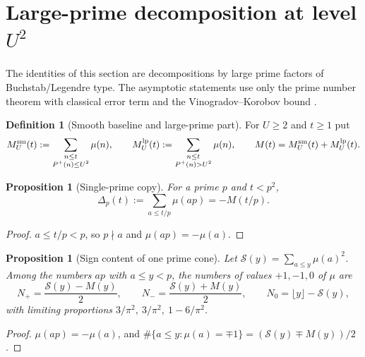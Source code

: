 \documentclass[11pt]{amsart}
\numberwithin{equation}{section}
\theoremstyle{plain}
\newtheorem{proposition}[theorem]{Proposition}
\theoremstyle{definition}
\newtheorem{definition}[theorem]{Definition}
\theoremstyle{remark}
\newcommand{\Pp}{P^{+}}
\newcommand{\Sq}{\mathcal{S}}
\begin{document}
\section{Large-prime decomposition at level \texorpdfstring{$U^2$}{U squared}}
\label{sec:prime_copy_propagation}

The identities of this section are decompositions by large prime factors of
Buchstab/Legendre type. The asymptotic statements use only the prime number
theorem with classical error term and the Vinogradov--Korobov bound
\cite{MontgomeryVaughan2007,Walfisz1963}.

\begin{definition}[Smooth baseline and large-prime part]
\label{def:baseline_channel}
For $U\ge2$ and $t\ge1$ put
\begin{equation}
\label{eq:baseline_channel_def}
  M^{\rm sm}_U(t):=\sum_{\substack{n\le t\\ \Pp(n)\le U^2}}\mu(n),\qquad
  M^{\rm lp}_U(t):=\sum_{\substack{n\le t\\ \Pp(n)>U^2}}\mu(n),\qquad
  M(t)=M^{\rm sm}_U(t)+M^{\rm lp}_U(t).
\end{equation}
\end{definition}

\begin{proposition}[Single-prime copy]
\label{prop:single_prime_copy}
For a prime $p$ and $t<p^2$,
\begin{equation}
\label{eq:single-prime-copy}
  \Delta_p(t):=\sum_{a\le t/p}\mu(ap)=-M(t/p).
\end{equation}
\end{proposition}

\begin{proof}
$a\le t/p<p$, so $p\nmid a$ and $\mu(ap)=-\mu(a)$.
\end{proof}

\begin{proposition}[Sign content of one prime cone]
\label{prop:prime-cone-signs}
Let $\Sq(y)=\sum_{a\le y}\mu(a)^2$. Among the numbers $ap$ with $a\le y<p$,
the numbers of values $+1,-1,0$ of $\mu$ are
\begin{equation}
\label{eq:cone_counts}
  N_+=\frac{\Sq(y)-M(y)}{2},\qquad N_-=\frac{\Sq(y)+M(y)}{2},\qquad
  N_0=\lfloor y\rfloor-\Sq(y),
\end{equation}
with limiting proportions $3/\pi^2,\ 3/\pi^2,\ 1-6/\pi^2$.
\end{proposition}

\begin{proof}
$\mu(ap)=-\mu(a)$, and $\#\{a\le y:\mu(a)=\mp1\}=(\Sq(y)\mp M(y))/2$.
\end{proof}
\end{document}
